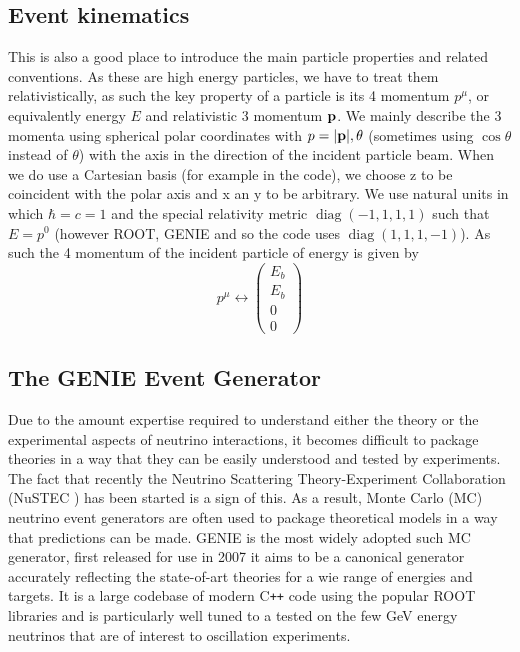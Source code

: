 \documentclass[a4paper,12pt]{article}
\DeclareMathOperator{\diag}{diag}
\begin{document}
\subsection{Event kinematics}
This is also a good place to introduce the main particle properties and related conventions.
As these are high energy particles, we have to treat them relativistically, as such the key property of a particle is its 4 momentum $p^\mu$, or equivalently energy $E$ and relativistic 3 momentum $\vb{p}$.
We mainly describe the 3 momenta using spherical polar coordinates with $p = \lvert \vb{p} \rvert, \theta$ (sometimes using $\cos{\theta}$ instead of $\theta$) with the axis in the direction of the incident particle beam.
When we do use a Cartesian basis (for example  in the code), we choose z to be coincident with the polar axis and x an y to be arbitrary.
We use natural units in which $\hbar = c = 1$ and the special relativity metric $\diag(-1, 1, 1, 1)$ such that $E = p^0$ (however ROOT, GENIE and so the code uses $\diag(1, 1, 1, -1)$).
As such the 4 momentum of the incident particle of energy  is given by
\begin{equation}
    p^\mu \leftrightarrow \begin{pmatrix} E_b \\ E_b \\ 0 \\ 0 \end{pmatrix}
\end{equation}

\subsection{The GENIE Event Generator \cite{andreopoulosGENIENeutrinoMonte2010}}
Due to the amount expertise required to understand either the theory or the experimental aspects of neutrino interactions, it becomes difficult to package theories in a way that they can be easily understood and tested by experiments.
The fact that recently the Neutrino Scattering Theory-Experiment Collaboration (NuSTEC \cite{alvarez-rusoNuSTEC11NeutrinoScattering2018}) has been started is a sign of this.
As a result, Monte Carlo (MC) neutrino event generators are often used to package theoretical models in a way that predictions can be made.
GENIE is the most widely adopted such MC generator, first released for use in 2007 it aims to be a canonical generator accurately reflecting the state-of-art theories for a wie range of energies and targets.
It is a large codebase of modern C\texttt{++} code using the popular ROOT libraries\cite{brunROOTObjectOriented1997} and is particularly well tuned to a tested on the few \si{GeV} energy neutrinos that are of interest to oscillation experiments.
\end{document}
